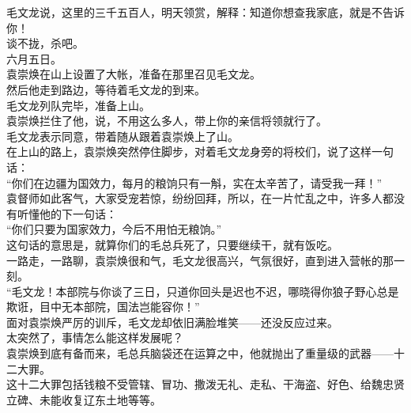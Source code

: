 \begin{multicols}{\theparacolNo}
毛文龙说，这里的三千五百人，明天领赏，解释：知道你想查我家底，就是不告诉你！\\

谈不拢，杀吧。\\

六月五日。\\

袁崇焕在山上设置了大帐，准备在那里召见毛文龙。\\

然后他走到路边，等待着毛文龙的到来。\\

毛文龙列队完毕，准备上山。\\

袁崇焕拦住了他，说，不用这么多人，带上你的亲信将领就行了。\\

毛文龙表示同意，带着随从跟着袁崇焕上了山。\\

在上山的路上，袁崇焕突然停住脚步，对着毛文龙身旁的将校们，说了这样一句话：\\

“你们在边疆为国效力，每月的粮饷只有一斛，实在太辛苦了，请受我一拜！”\\

袁督师如此客气，大家受宠若惊，纷纷回拜，所以，在一片忙乱之中，许多人都没有听懂他的下一句话：\\

“你们只要为国家效力，今后不用怕无粮饷。”\\

这句话的意思是，就算你们的毛总兵死了，只要继续干，就有饭吃。\\

一路走，一路聊，袁崇焕很和气，毛文龙很高兴，气氛很好，直到进入营帐的那一刻。\\

“毛文龙！本部院与你谈了三日，只道你回头是迟也不迟，哪晓得你狼子野心总是欺诳，目中无本部院，国法岂能容你！”\\

面对袁崇焕严厉的训斥，毛文龙却依旧满脸堆笑——还没反应过来。\\

太突然了，事情怎么能这样发展呢？\\

袁崇焕到底有备而来，毛总兵脑袋还在运算之中，他就抛出了重量级的武器——十二大罪。\\

这十二大罪包括钱粮不受管辖、冒功、撒泼无礼、走私、干海盗、好色、给魏忠贤立碑、未能收复辽东土地等等。\\


\end{multicols}
